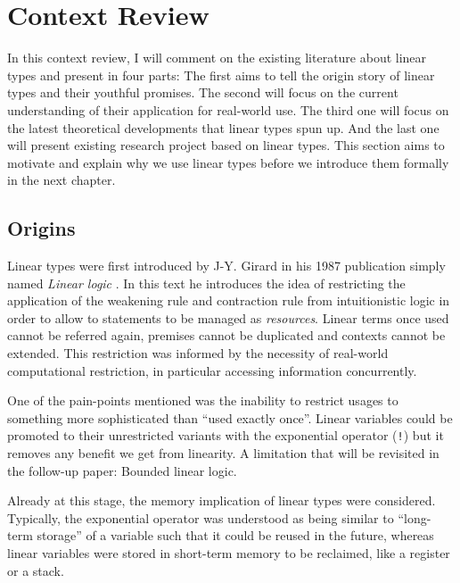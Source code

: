 \documentclass[
]{article}
\begin{document}
\newpage

\hypertarget{context-review}{%
\section{Context Review}\label{context-review}}

In this context review, I will comment on the existing literature about
linear types and present in four parts: The first aims to tell the
origin story of linear types and their youthful promises. The second
will focus on the current understanding of their application for
real-world use. The third one will focus on the latest theoretical
developments that linear types spun up. And the last one will present
existing research project based on linear types. This section aims to
motivate and explain why we use linear types before we introduce them
formally in the next chapter.

\hypertarget{origins}{%
\subsection{Origins}\label{origins}}

Linear types were first introduced by J-Y. Girard in his
1987\cite{linear-logic} publication simply named \emph{Linear logic} .
In this text he introduces the idea of restricting the application of
the weakening rule and contraction rule from intuitionistic logic in
order to allow to statements to be managed as \emph{resources}. Linear
terms once used cannot be referred again, premises cannot be duplicated
and contexts cannot be extended. This restriction was informed by the
necessity of real-world computational restriction, in particular
accessing information concurrently.

One of the pain-points mentioned was the inability to restrict usages to
something more sophisticated than ``used exactly once''. Linear
variables could be promoted to their unrestricted variants with the
exponential operator (\texttt{!}) but it removes any benefit we get from
linearity. A limitation that will be revisited in the follow-up paper:
Bounded linear logic.

Already at this stage, the memory implication of linear types were
considered. Typically, the exponential operator was understood as being
similar to ``long-term storage'' of a variable such that it could be
reused in the future, whereas linear variables were stored in short-term
memory to be reclaimed, like a register or a stack.
\end{document}
